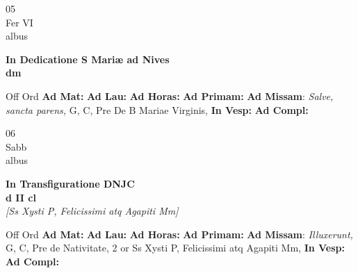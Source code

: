 \documentclass[10pt, openany]{book}
\begin{document}
    \begin{center}
        \begin{minipage}{3.5in}
            \vspace{2em}
            \begin{minipage}{0.5in}
                {\Huge 05} \\
                {\normalsize Fer VI} \\
                {\normalsize albus}
            \end{minipage}
            \begin{minipage}{3.0in}
                \textbf{ \large In Dedicatione S Mariæ ad Nives \\
                \textnormal{\normalsize dm}} \\ 
            \end{minipage}
            \begin{justify}Off Ord
                \textbf{Ad Mat: }
                \textbf{Ad Lau: }
                \textbf{Ad Horas: }
                \textbf{Ad Primam: }\textbf{Ad Missam}: \textit{Salve, sancta parens,} G, C, Pre De B Mariae Virginis,  
                \textbf{In Vesp: }
                \textbf{Ad Compl: }
            \end{justify}
        \end{minipage}
    \end{center}

    \begin{center}
        \begin{minipage}{3.5in}
            \vspace{2em}
            \begin{minipage}{0.5in}
                {\Huge 06} \\
                {\normalsize Sabb} \\
                {\normalsize albus}
            \end{minipage}
            \begin{minipage}{3.0in}
                \textbf{ \large In Transfiguratione DNJC \\
                \textnormal{\normalsize d II cl}} \\ \textit{[Ss Xysti P, Felicissimi atq Agapiti Mm]} \\ 
            \end{minipage}
            \begin{justify}Off Ord
                \textbf{Ad Mat: }
                \textbf{Ad Lau: }
                \textbf{Ad Horas: }
                \textbf{Ad Primam: }\textbf{Ad Missam}: \textit{Illuxerunt,} G, C, Pre de Nativitate, 2 or Ss Xysti P, Felicissimi atq Agapiti Mm,  
                \textbf{In Vesp: }
                \textbf{Ad Compl: }
            \end{justify}
        \end{minipage}
    \end{center}
\end{document}
